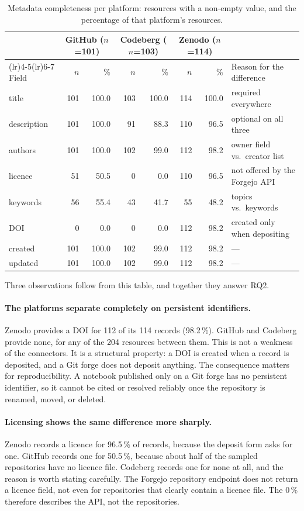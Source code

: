 \begin{table}[htbp]
\centering
\caption{Metadata completeness per platform: resources with a non-empty value, and the percentage of that platform's resources.}
\label{tab:metadata-completeness}
\small
\begin{tabularx}{\textwidth}{@{}>{\raggedright\arraybackslash}p{2.2cm} r r r r r r X@{}}
\toprule
& \multicolumn{2}{c}{GitHub ($n$=101)} & \multicolumn{2}{c}{Codeberg ($n$=103)} & \multicolumn{2}{c}{Zenodo ($n$=114)} & \tabularnewline
\cmidrule(lr){2-3}\cmidrule(lr){4-5}\cmidrule(lr){6-7}
Field & $n$ & \% & $n$ & \% & $n$ & \% & Reason for the difference\tabularnewline
\midrule
title & 101 & 100.0 & 103 & 100.0 & 114 & 100.0 & required everywhere\tabularnewline
description & 101 & 100.0 & 91 & 88.3 & 110 & 96.5 & optional on all three\tabularnewline
authors & 101 & 100.0 & 102 & 99.0 & 112 & 98.2 & owner field vs.\ creator list\tabularnewline
licence & 51 & 50.5 & 0 & 0.0 & 110 & 96.5 & not offered by the Forgejo API\tabularnewline
keywords & 56 & 55.4 & 43 & 41.7 & 55 & 48.2 & topics vs.\ keywords\tabularnewline
DOI & 0 & 0.0 & 0 & 0.0 & 112 & 98.2 & created only when depositing\tabularnewline
created & 101 & 100.0 & 102 & 99.0 & 112 & 98.2 & ---\tabularnewline
updated & 101 & 100.0 & 102 & 99.0 & 112 & 98.2 & ---\tabularnewline
\bottomrule
\end{tabularx}
\end{table}

Three observations follow from this table, and together they answer RQ2.

\paragraph{The platforms separate completely on persistent identifiers.} Zenodo provides a DOI for 112 of its 114 records (98.2\,\%). GitHub and Codeberg provide none, for any of the 204 resources between them. This is not a weakness of the connectors. It is a structural property: a DOI is created when a record is deposited, and a Git forge does not deposit anything. The consequence matters for reproducibility. A notebook published only on a Git forge has no persistent identifier, so it cannot be cited or resolved reliably once the repository is renamed, moved, or deleted.

\paragraph{Licensing shows the same difference more sharply.} Zenodo records a licence for 96.5\,\% of records, because the deposit form asks for one. GitHub records one for 50.5\,\%, because about half of the sampled repositories have no licence file. Codeberg records one for none at all, and the reason is worth stating carefully. The Forgejo repository endpoint does not return a licence field, not even for repositories that clearly contain a licence file. The 0\,\% therefore describes the API, not the repositories.


